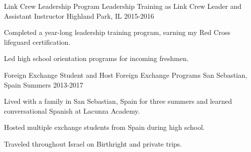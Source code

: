 

\begin{cventries}

  \cventry
    {Link Crew Leadership Program} %
    {Leadership Training as Link Crew Leader and Assistant Instructor} %
    {Highland Park, IL} %
    {2015-2016} %
    {
      \begin{cvitems} %
        \item {Completed a year-long leadership training program, earning my Red Cross lifeguard certification.}
        \item {Led high school orientation programs for incoming freshmen.}
      \end{cvitems}
    } 

  \cventry
    {Foreign Exchange Student and Host} %
    {Foreign Exchange Programs} %
    {San Sebastian, Spain} %
    {Summers 2013-2017} %
    {
      \begin{cvitems} %
        \item {Lived with a family in San Sebastian, Spain for three summers and learned conversational Spanish at Lacunza Academy.}
        \item {Hosted multiple exchange students from Spain during high school.}
        \item {Traveled throughout Israel on Birthright and private trips.}
     \end{cvitems}
    }

\end{cventries}
